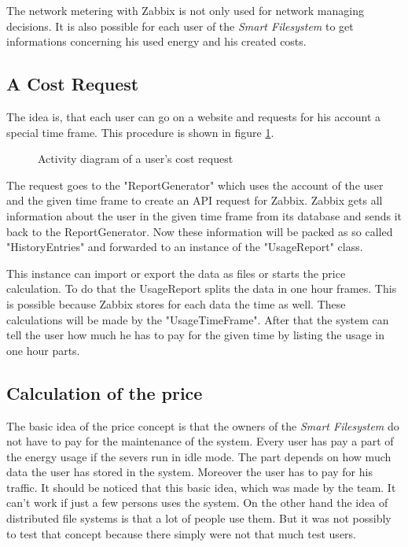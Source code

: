 The network metering with Zabbix is not only used for network managing  decisions. It is also possible for each user of the \textit{Smart Filesystem} to get informations concerning his used energy and his created costs.
\subsection{A Cost Request}
 The idea is, that each user can go on a website and requests for his account a special time frame. This procedure is shown in figure \ref{akt}.
 \begin{figure}
 \centering
 
 \caption{Activity diagram of a user's cost request}
 \label{akt}
 \end{figure}


 The request goes to the "ReportGenerator" which uses the account of the user and the given time frame to create an API request for Zabbix. Zabbix gets all information about the user in the given time frame from its database and sends it back to the ReportGenerator. Now these information will be packed as so called "HistoryEntries" and forwarded to an instance of the "UsageReport" class. 
 
 This instance can import or export the data as files or starts the price calculation. To do that the UsageReport splits the data in one hour frames. This is possible because Zabbix stores for each data the time as well. These calculations will be made by the "UsageTimeFrame". After that the system can tell the user how much he has to pay for the given time by listing the usage in one hour parts.
 
 \subsection{Calculation of the price} 
 The basic idea of the price concept is that the owners of the \textit{Smart Filesystem} do not have to pay for the maintenance of the system. Every user has pay a part of the energy usage if the severs run in idle mode. The part depends on how much data the user has stored in the system. Moreover the user has to pay for his traffic. It should be noticed that this basic idea, which was made by the team. It can't work if just a few persons uses the system. On the other hand the idea of distributed file systems is that a lot of people use them. But it was not possibly to test that concept because there simply were not that much test users. 
 
